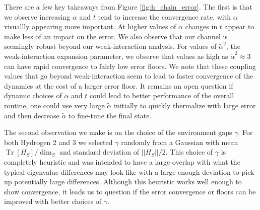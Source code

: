 \documentclass[
 amsmath,amssymb,
 aps,
onecolumn, 
nofootinbib]{revtex4-2}
\newcommand{\brackets}[1]{\left[ #1 \right]}
\newcommand{\norm}[1]{\left|\left| #1 \right|\right|}
\DeclareMathOperator{\Tr}{Tr}
\newcommand{\trace}[1]{\Tr \brackets{ #1 }}
\begin{document}
There are a few key takeaways from Figure \ref{fig:h_chain_error}. The first is that we observe increasing $\alpha$ and $t$ tend to increase the convergence rate, with $\alpha$ visuallly appearing more important. At higher values of $\alpha$ changes in $t$ appear to make less of an impact on the error. We also observe that our channel is seemingly robust beyond our weak-interaction analysis. For values of $\widetilde{\alpha}^2$, the weak-interaction expansion parameter, we observe that values as high as $\widetilde{\alpha}^2 \approx 3$ can have rapid convergence to fairly low error floors. We note that these coupling values that go beyond weak-interaction seem to lead to faster convergence of the dynamics at the cost of a larger error floor. It remains an open question if dynamic choices of $\alpha$ and $t$ could lead to better performance of the overall routine, one could use very large $\widetilde{\alpha}$ initially to quickly thermalize with large error and then decrease $\widetilde{\alpha}$ to fine-tune the final state.

The second observation we make is on the choice of the environment gaps $\gamma$. For both Hydrogen 2 and 3 we selected $\gamma $ randomly from a Gaussian with mean $\trace{H_S} / \dim_S$ and standard deviation of $\norm{H_S} / 2$. This choice of $\gamma$ is completely heuristic and was intended to have a large overlap with what the typical eigenvalue differences may look like with a large enough deviation to pick up potentially large differences. Although this heuristic works well enough to show convergence, it leads us to question if the error convergence or floors can be improved with better choices of $\gamma$. 
\end{document}
